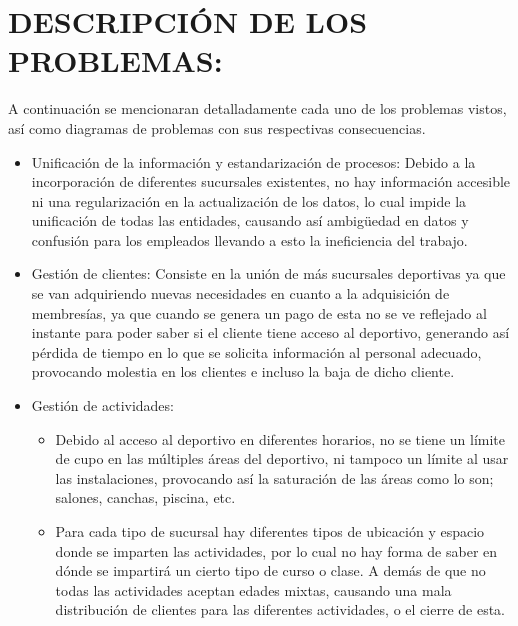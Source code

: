 \documentclass[12pt,letterpaper]{article}
\begin{document}
\section{DESCRIPCIÓN DE LOS PROBLEMAS:}
A continuación se mencionaran detalladamente cada uno de los problemas vistos, así como diagramas de problemas con sus respectivas consecuencias.
\begin{itemize}
    \item Unificación de la información y estandarización de procesos:
Debido a la incorporación de diferentes sucursales existentes, no hay información accesible ni una regularización en la actualización de los datos, lo cual impide la unificación de todas las entidades, causando así ambigüedad en datos y confusión para los empleados llevando a esto la ineficiencia del trabajo.
    \item Gestión de clientes: 
Consiste en la unión de más sucursales deportivas ya que se van adquiriendo nuevas necesidades en cuanto a la adquisición de membresías, ya que cuando se genera un pago de esta no se ve reflejado al instante para poder saber si el cliente tiene acceso al deportivo, generando así pérdida de tiempo en lo que se solicita información al personal adecuado, provocando molestia en los clientes e incluso la baja de dicho cliente.
\item Gestión de actividades: 
    \begin{itemize}
    \item Debido al acceso al deportivo en diferentes horarios, no se tiene un límite de cupo en las múltiples áreas del deportivo, ni tampoco un límite al usar las instalaciones, provocando así la saturación de las áreas como lo son; salones, canchas, piscina, etc.
    \item Para cada tipo de sucursal hay diferentes tipos de ubicación y espacio donde se imparten las actividades, por lo cual no hay forma de saber en dónde se impartirá un cierto tipo de curso o clase. A demás de que no todas las actividades aceptan edades mixtas, causando una mala distribución de clientes para las diferentes actividades, o el cierre de esta.
    \end{itemize}
\end{itemize}
\end{document}
